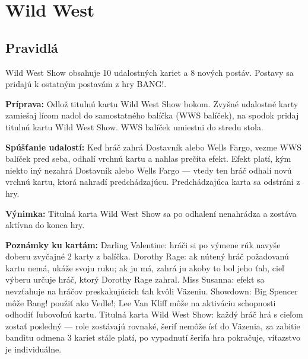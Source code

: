 \chapter{Wild West}

\section*{Pravidlá}
\noindent Wild West Show obsahuje 10 udalostných kariet a 8 nových postáv. Postavy sa pridajú k ostatným postavám z hry BANG!.

\textbf{Príprava:} Odlož titulnú kartu Wild West Show bokom. Zvyšné udalostné karty zamiešaj lícom nadol do samostatného balíčka (WWS balíček), na spodok pridaj titulnú kartu Wild West Show. WWS balíček umiestni do stredu stola.

\textbf{Spúšťanie udalostí:} Keď hráč zahrá Dostavník alebo Wells Fargo, vezme WWS balíček pred seba, odhalí vrchnú kartu a nahlas prečíta efekt. Efekt platí, kým niekto iný nezahrá Dostavník alebo Wells Fargo — vtedy ten hráč odhalí novú vrchnú kartu, ktorá nahradí predchádzajúcu. Predchádzajúca karta sa odstráni z hry.

\textbf{Výnimka:} Titulná karta Wild West Show sa po odhalení nenahrádza a zostáva aktívna do konca hry.

\textbf{Poznámky ku kartám:} Darling Valentine: hráči si po výmene rúk navyše doberu zvyčajné 2 karty z balíčka. Dorothy Rage: ak nútený hráč požadovanú kartu nemá, ukáže svoju ruku; ak ju má, zahrá ju akoby to bol jeho ťah, cieľ výberu určuje hráč, ktorý Dorothy Rage zahral. Miss Susanna: efekt sa nevzťahuje na hráčov preskakujúcich ťah kvôli Väzeniu. Showdown: Big Spencer môže Bang! použiť ako Vedle!; Lee Van Kliff môže na aktiváciu schopnosti odhodiť ľubovoľnú kartu. Titulná karta Wild West Show: každý hráč hrá s cieľom zostať posledný — role zostávajú rovnaké, šerif nemôže ísť do Väzenia, za zabitie banditu odmena 3 kariet stále platí, po vypadnutí šerifa hra pokračuje, víťazstvo je individuálne.

